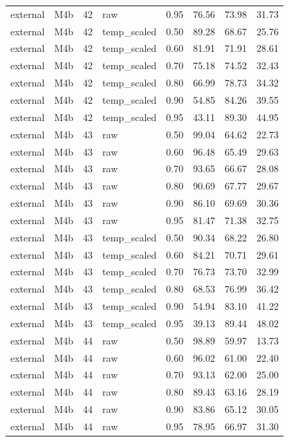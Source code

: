 \begin{tabular}{llrlrrrr}
external & M4b & 42 & raw & 0.95 & 76.56 & 73.98 & 31.73 \\
external & M4b & 42 & temp\_scaled & 0.50 & 89.28 & 68.67 & 25.76 \\
external & M4b & 42 & temp\_scaled & 0.60 & 81.91 & 71.91 & 28.61 \\
external & M4b & 42 & temp\_scaled & 0.70 & 75.18 & 74.52 & 32.43 \\
external & M4b & 42 & temp\_scaled & 0.80 & 66.99 & 78.73 & 34.32 \\
external & M4b & 42 & temp\_scaled & 0.90 & 54.85 & 84.26 & 39.55 \\
external & M4b & 42 & temp\_scaled & 0.95 & 43.11 & 89.30 & 44.95 \\
external & M4b & 43 & raw & 0.50 & 99.04 & 64.62 & 22.73 \\
external & M4b & 43 & raw & 0.60 & 96.48 & 65.49 & 29.63 \\
external & M4b & 43 & raw & 0.70 & 93.65 & 66.67 & 28.08 \\
external & M4b & 43 & raw & 0.80 & 90.69 & 67.77 & 29.67 \\
external & M4b & 43 & raw & 0.90 & 86.10 & 69.69 & 30.36 \\
external & M4b & 43 & raw & 0.95 & 81.47 & 71.38 & 32.75 \\
external & M4b & 43 & temp\_scaled & 0.50 & 90.34 & 68.22 & 26.80 \\
external & M4b & 43 & temp\_scaled & 0.60 & 84.21 & 70.71 & 29.61 \\
external & M4b & 43 & temp\_scaled & 0.70 & 76.73 & 73.70 & 32.99 \\
external & M4b & 43 & temp\_scaled & 0.80 & 68.53 & 76.99 & 36.42 \\
external & M4b & 43 & temp\_scaled & 0.90 & 54.94 & 83.10 & 41.22 \\
external & M4b & 43 & temp\_scaled & 0.95 & 39.13 & 89.44 & 48.02 \\
external & M4b & 44 & raw & 0.50 & 98.89 & 59.97 & 13.73 \\
external & M4b & 44 & raw & 0.60 & 96.02 & 61.00 & 22.40 \\
external & M4b & 44 & raw & 0.70 & 93.13 & 62.00 & 25.00 \\
external & M4b & 44 & raw & 0.80 & 89.43 & 63.16 & 28.19 \\
external & M4b & 44 & raw & 0.90 & 83.86 & 65.12 & 30.05 \\
external & M4b & 44 & raw & 0.95 & 78.95 & 66.97 & 31.30 \\

\end{tabular}
